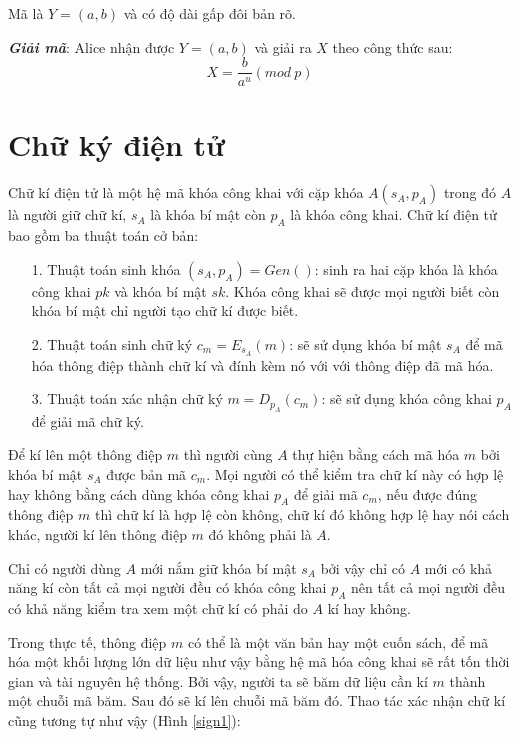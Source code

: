 \documentclass[a4paper,12pt]{report}
\begin{document}
Mã là $Y = (a,b)$ và có độ dài gấp đôi bản rõ.

\textbf{\textit{Giải mã}}: Alice nhận được $Y = (a,b)$ và giải ra $X$ theo công thức sau:
\begin{displaymath}
X = \frac{b}{a^u} (mod \ p)
\end{displaymath}
\section{Chữ ký điện tử}
Chữ kí điện tử là một hệ mã khóa công khai với cặp khóa $A(s_A, p_A)$ trong đó $A$ là người giữ chữ kí, $s_A$ là khóa bí mật còn $p_A$ là khóa công khai. Chữ kí điện tử bao gồm ba thuật toán cở bản:
\begin{itemize}
\item[1. ] Thuật toán sinh khóa $(s_A, p_A) = Gen()$: sinh ra hai cặp khóa là khóa công khai $pk$ và khóa bí mật $sk$. Khóa công khai sẽ được mọi người biết còn khóa bí mật chỉ người tạo chữ kí được biết.
\item[2. ] Thuật toán sinh chữ ký $c_m = E_{s_A}(m)$: sẽ sử dụng khóa bí mật $s_A$ để mã hóa thông điệp thành chữ kí và đính kèm nó với với thông điệp đã mã hóa.
\item[3. ] Thuật toán xác nhận chữ ký $m = D_{p_A}(c_m)$: sẽ sử dụng khóa công khai $p_A$ để giải mã chữ ký.   
\end{itemize}

Để kí lên một thông điệp $m$ thì người cùng $A$ thự hiện bằng cách mã hóa $m$ bởi khóa bí mật $s_A$ được bản mã $c_m$. Mọi người có thể kiểm tra chữ kí này có hợp lệ hay không bằng cách dùng khóa công khai $p_A$ để giải mã $c_m$, nếu được đúng thông điệp $m$ thì chữ kí là hợp lệ còn không, chữ kí đó không hợp lệ hay nói cách khác, người kí lên thông điệp $m$ đó không phải là $A$.

Chỉ có người dùng $A$ mới nắm giữ khóa bí mật $s_A$ bởi vậy chỉ có $A$ mới có khả năng kí còn tất cả mọi người đều có khóa công khai $p_A$ nên tất cả mọi người đều có khả năng kiểm tra xem một chữ kí có phải do $A$ kí hay không.

Trong thực tế, thông điệp $m$ có thể là một văn bản hay một cuốn sách, để mã hóa một khối lượng lớn dữ liệu như vậy bằng hệ mã hóa công khai sẽ rất tốn thời gian và tài nguyên hệ thống. Bởi vậy, người ta sẽ băm dữ liệu cần kí $m$ thành một chuỗi mã băm. Sau đó sẽ kí lên chuỗi mã băm đó. Thao tác xác nhận chữ kí cũng tương tự như vậy (Hình \ref{sign1}):
\end{document}
